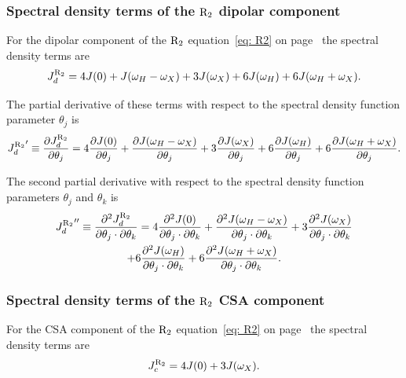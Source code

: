 \subsubsection{Spectral density terms of the $\mathrm{R}_2$ dipolar component}

For the dipolar component of the $\mathrm{R}_2$ equation~\eqref{eq: R2} on page~\pageref{eq: R2} the spectral density terms are
\begin{equation}
    J_d^{\mathrm{R}_2} = 4J(0) + J(\omega_H - \omega_X) + 3J(\omega_X) + 6J(\omega_H) + 6J(\omega_H + \omega_X).  \label{eq: J terms: JR2d}
\end{equation}

\noindent The partial derivative of these terms with respect to the spectral density function parameter $\theta_j$ is
\begin{equation}
    {J_d^{\mathrm{R}_2}}' \equiv \frac{\partial J_d^{\mathrm{R}_2}}{\partial \theta_j}
        = 4 \frac{\partial J(0)}{\partial \theta_j}
        + \frac{\partial J(\omega_H - \omega_X)}{\partial \theta_j}
        + 3 \frac{\partial J(\omega_X)}{\partial \theta_j}
        + 6 \frac{\partial J(\omega_H)}{\partial \theta_j}
        + 6 \frac{\partial J(\omega_H + \omega_X)}{\partial \theta_j}.  \label{eq: J terms: JR2d'}
\end{equation}

\noindent The second partial derivative with respect to the spectral density function parameters $\theta_j$ and $\theta_k$ is
\begin{multline}
    {J_d^{\mathrm{R}_2}}'' \equiv \frac{\partial^2 J_d^{\mathrm{R}_2}}{\partial \theta_j \cdot \partial \theta_k}
        = 4 \frac{\partial^2 J(0)}{\partial \theta_j \cdot \partial \theta_k}
        + \frac{\partial^2 J(\omega_H - \omega_X)}{\partial \theta_j \cdot \partial \theta_k}
        + 3 \frac{\partial^2 J(\omega_X)}{\partial \theta_j \cdot \partial \theta_k} \\
        + 6 \frac{\partial^2 J(\omega_H)}{\partial \theta_j \cdot \partial \theta_k}
        + 6 \frac{\partial^2 J(\omega_H + \omega_X)}{\partial \theta_j \cdot \partial \theta_k}.  \label{eq: J terms: JR2d"}
\end{multline}


\subsubsection{Spectral density terms of the $\mathrm{R}_2$ CSA component}

For the CSA component of the $\mathrm{R}_2$ equation~\eqref{eq: R2} on page~\pageref{eq: R2} the spectral density terms are
\begin{equation}
    J_c^{\mathrm{R}_2} = 4J(0) + 3J(\omega_X).  \label{eq: J terms: JR2c}
\end{equation}

